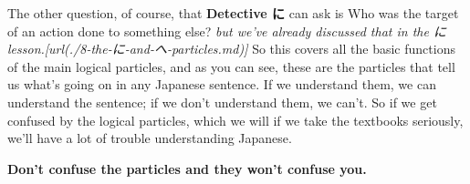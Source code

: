 \thinrule

The other question, of course, that {\bf Detective に} can ask is Who was the target of an action done to something else? {\em but we've already discussed that in the に lesson.\goto{{[}8{]}}[url(./8-the-に-and-へ-particles.md)]} So this covers all the basic functions of the main logical particles, and as you can see, these are the particles that tell us what's going on in any Japanese sentence. If we understand them, we can understand the sentence; if we don't understand them, we can't. So if we get confused by the logical particles, which we will if we take the textbooks seriously, we'll have a lot of trouble understanding Japanese.

{\bf Don't confuse the particles and they won't confuse you.}

\stopsectionlevel

\stopsectionlevel
